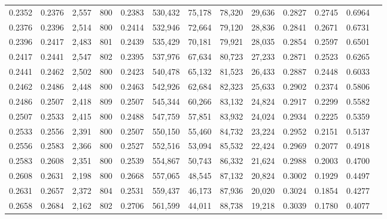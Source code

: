 \begin{tabular}{rrrrrrrrrrrrr}
0.2352 & 0.2376 &  2,557 & 800 &                                     0.2383 & 530,432 &  75,178 &  78,320 &  29,636 & 0.2827 & 0.2745 & 0.6964 \\
0.2376 & 0.2396 &  2,514 & 800 &                                     0.2414 & 532,946 &  72,664 &  79,120 &  28,836 & 0.2841 & 0.2671 & 0.6731 \\
0.2396 & 0.2417 &  2,483 & 801 &                                     0.2439 & 535,429 &  70,181 &  79,921 &  28,035 & 0.2854 & 0.2597 & 0.6501 \\
0.2417 & 0.2441 &  2,547 & 802 &                                     0.2395 & 537,976 &  67,634 &  80,723 &  27,233 & 0.2871 & 0.2523 & 0.6265 \\
0.2441 & 0.2462 &  2,502 & 800 &                                     0.2423 & 540,478 &  65,132 &  81,523 &  26,433 & 0.2887 & 0.2448 & 0.6033 \\
0.2462 & 0.2486 &  2,448 & 800 &                                     0.2463 & 542,926 &  62,684 &  82,323 &  25,633 & 0.2902 & 0.2374 & 0.5806 \\
0.2486 & 0.2507 &  2,418 & 809 &                                     0.2507 & 545,344 &  60,266 &  83,132 &  24,824 & 0.2917 & 0.2299 & 0.5582 \\
0.2507 & 0.2533 &  2,415 & 800 &                                     0.2488 & 547,759 &  57,851 &  83,932 &  24,024 & 0.2934 & 0.2225 & 0.5359 \\
0.2533 & 0.2556 &  2,391 & 800 &                                     0.2507 & 550,150 &  55,460 &  84,732 &  23,224 & 0.2952 & 0.2151 & 0.5137 \\
0.2556 & 0.2583 &  2,366 & 800 &                                     0.2527 & 552,516 &  53,094 &  85,532 &  22,424 & 0.2969 & 0.2077 & 0.4918 \\
0.2583 & 0.2608 &  2,351 & 800 &                                     0.2539 & 554,867 &  50,743 &  86,332 &  21,624 & 0.2988 & 0.2003 & 0.4700 \\
0.2608 & 0.2631 &  2,198 & 800 &                                     0.2668 & 557,065 &  48,545 &  87,132 &  20,824 & 0.3002 & 0.1929 & 0.4497 \\
0.2631 & 0.2657 &  2,372 & 804 &                                     0.2531 & 559,437 &  46,173 &  87,936 &  20,020 & 0.3024 & 0.1854 & 0.4277 \\
0.2658 & 0.2684 &  2,162 & 802 &                                     0.2706 & 561,599 &  44,011 &  88,738 &  19,218 & 0.3039 & 0.1780 & 0.4077 \\

\end{tabular}
